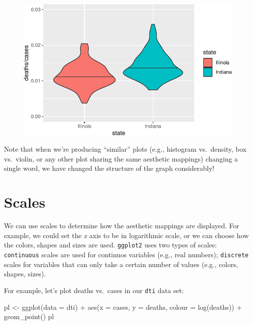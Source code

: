 \documentclass[
  letterpaper,
  DIV=11,
  numbers=noendperiod]{scrreprt}
\newenvironment{Shaded}{\begin{snugshade}}{\end{snugshade}}
\newcommand{\AttributeTok}[1]{\textcolor[rgb]{0.40,0.45,0.13}{#1}}
\newcommand{\FunctionTok}[1]{\textcolor[rgb]{0.28,0.35,0.67}{#1}}
\newcommand{\NormalTok}[1]{\textcolor[rgb]{0.00,0.23,0.31}{#1}}
\newcommand{\OtherTok}[1]{\textcolor[rgb]{0.00,0.23,0.31}{#1}}
\newcommand{\SpecialCharTok}[1]{\textcolor[rgb]{0.37,0.37,0.37}{#1}}
\begin{document}
\begin{figure}[H]

{\centering \includegraphics{./01-dataviz_files/figure-pdf/unnamed-chunk-17-1.pdf}

}

\end{figure}

Note that when we're producing ``similar'' plots (e.g., histogram
vs.~density, box vs.~violin, or any other plot sharing the same
aesthetic mappings) changing a single word, we have changed the
structure of the graph considerably!

\hypertarget{scales}{%
\section{Scales}\label{scales}}

We can use scales to determine how the aesthetic mappings are displayed.
For example, we could set the \emph{x} axis to be in logarithmic scale,
or we can choose how the colors, shapes and sizes are used.
\texttt{ggplot2} uses two types of scales: \texttt{continuous} scales
are used for continuos variables (e.g., real numbers); \texttt{discrete}
scales for variables that can only take a certain number of values
(e.g., colors, shapes, sizes).

For example, let's plot deaths vs.~cases in our \texttt{dti} data set:

\begin{Shaded}
\begin{Highlighting}[]
\NormalTok{pl }\OtherTok{\textless{}{-}} \FunctionTok{ggplot}\NormalTok{(}\AttributeTok{data =}\NormalTok{ dti) }\SpecialCharTok{+} 
  \FunctionTok{aes}\NormalTok{(}\AttributeTok{x =}\NormalTok{ cases, }\AttributeTok{y =}\NormalTok{ deaths, }\AttributeTok{colour =} \FunctionTok{log}\NormalTok{(deaths)) }\SpecialCharTok{+}
    \FunctionTok{geom\_point}\NormalTok{() }
\NormalTok{pl}
\end{Highlighting}
\end{Shaded}
\end{document}
